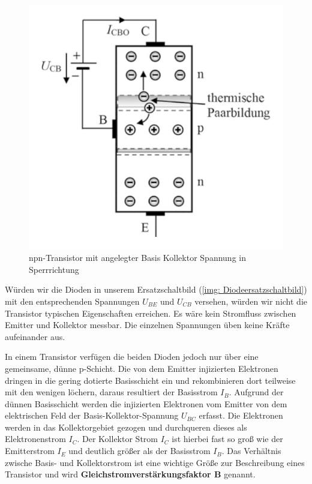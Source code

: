 \begin{figure}[!htb]
	\centering
	\includegraphics[scale=0.8]{images/UCEUebergang.png} 
	\caption{npn-Transistor mit angelegter Basis Kollektor Spannung in Sperrrichtung\cite{Stiny2018}}
	\label{img: UBC}		
\end{figure}	

Würden wir die Dioden in unserem Ersatzschaltbild (\ref{img: Diodeersatzschaltbild}) mit den entsprechenden Spannungen $U_{BE}$ und $U_{CB}$ versehen, würden wir nicht die Transistor typischen Eigenschaften erreichen. Es wäre kein Stromfluss zwischen Emitter und Kollektor messbar. Die einzelnen Spannungen üben keine Kräfte aufeinander aus.


In einem Transistor verfügen die beiden Dioden jedoch nur über eine gemeinsame, dünne p-Schicht. Die von dem Emitter injizierten Elektronen dringen in die gering dotierte Basisschicht ein und rekombinieren  dort teilweise mit den wenigen löchern, daraus resultiert der Basisstrom $I_B$. Aufgrund der dünnen Basisschicht werden die injizierten Elektronen vom Emitter von dem elektrischen Feld der Basis-Kollektor-Spannung $U_{BC}$ erfasst. Die Elektronen werden in das Kollektorgebiet gezogen und durchqueren dieses als Elektronenstrom $I_C$. Der Kollektor Strom $I_C$ ist hierbei fast so groß wie der Emitterstrom $I_E$ und deutlich größer als der Basisstrom $I_B$. Das Verhältnis zwische Basis- und Kollektorstrom ist eine wichtige Größe zur Beschreibung eines Transistor und wird \textbf{Gleichstromverstärkungsfaktor B} genannt. 

